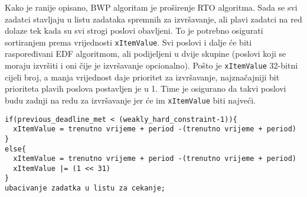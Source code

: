 \documentclass[../zavrsni.tex]{subfiles}
\begin{document}
Kako je ranije opisano, BWP algoritam je proširenje RTO algoritma. Sada se svi zadatci stavljaju u listu zadataka spremnih za izvršavanje,
ali plavi zadatci na red dolaze tek kada su svi strogi poslovi obavljeni. To je potrebno osigurati sortiranjem prema vrijednosti
\texttt{xItemValue}. Svi poslovi i dalje će biti raspoređivani EDF algoritmom, ali podijeljeni u dvije skupine (poslovi koji se moraju
izvršiti i oni čije je izvršavanje opcionalno). Pošto je \texttt{xItemValue} 32-bitni cijeli broj, a manja vrijednost daje prioritet
za izvršavanje, najznačajniji bit prioriteta plavih poslova postavljen je u 1. Time je osigurano da takvi poslovi budu 
zadnji na redu za izvršavanje jer će im \texttt{xItemValue} biti najveći.  

\begin{lstlisting}[style=CStyle,caption={Pseudokod implementacije algoritma BWP},captionpos=b]
if(previous_deadline_met < (weakly_hard_constraint-1)){
  xItemValue = trenutno vrijeme + period -(trenutno vrijeme + period) 
}
else{
  xItemValue = trenutno vrijeme + period -(trenutno vrijeme + period)
  xItemValue |= (1 << 31)
}
ubacivanje zadatka u listu za cekanje;
\end{lstlisting}
\end{document}
